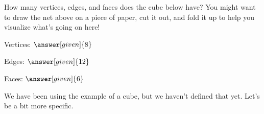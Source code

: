 \documentclass{ximera}
\begin{document}
\begin{question}
How many vertices, edges, and faces does the cube below have? You might want to draw the net above on a piece of paper, cut it out, and fold it up to help you visualize what's going on here!
\begin{image}

Vertices: $\answer[given]{8}$

Edges: $\answer[given]{12}$

Faces: $\answer[given]{6}$
\end{image}
\end{question}

We have been using the example of a cube, but we haven't defined that yet. Let's be a bit more specific.
\end{document}
